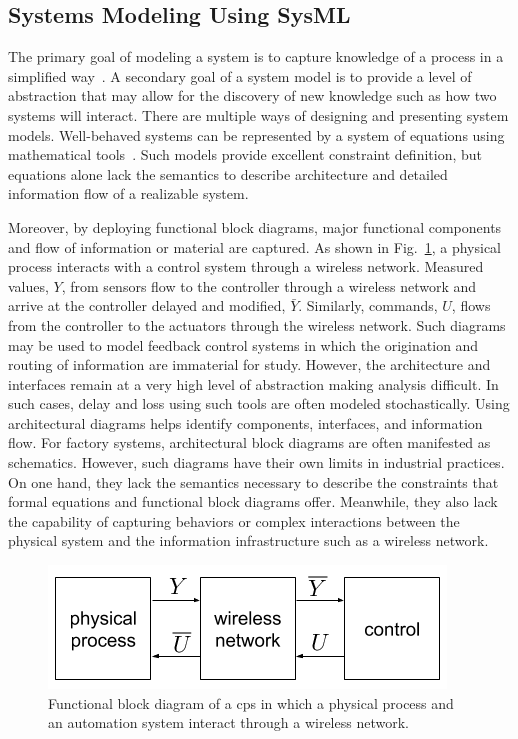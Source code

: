 \subsection{Systems Modeling Using SysML} \label{sysml:sec:systemsmodeling}

The primary goal of modeling a system is to capture knowledge of a process in a simplified way~\cite{SysModel2004}. A secondary goal of a system model is to provide a level of abstraction that may allow for the discovery of new knowledge such as how two systems will interact. There are multiple ways of designing and presenting system models. Well-behaved systems can be represented by a system of equations using mathematical tools~\cite{SimModel1999}. Such models provide excellent constraint definition, but equations alone lack the semantics to describe architecture and detailed information flow of a realizable system.

Moreover, by deploying functional block diagrams, major functional components and flow of information or material are captured. As shown in Fig.~\ref{sysml:fig:fbd-system}, a physical process interacts with a control system through a wireless network.  Measured values, $Y$, from sensors flow to the controller through a wireless network and arrive at the controller delayed and modified, $\bar{Y}$. Similarly, commands, $U$, flows from the controller to the actuators through the wireless network. Such diagrams may be used to model feedback control systems in which the origination and routing of information are immaterial for study. However, the architecture and interfaces remain at a very high level of abstraction making analysis difficult. In such cases, delay and loss using such tools are often modeled stochastically. Using architectural diagrams helps identify components, interfaces, and information flow. For factory systems, architectural block diagrams are often manifested as schematics. However, such diagrams have their own limits in industrial practices. On one hand, they lack the semantics necessary to describe the constraints that formal equations and functional block diagrams offer. Meanwhile, they also lack the capability of capturing behaviors or complex interactions between the physical system and the information infrastructure such as a wireless network. 

\begin{figure}
	\centering
	\includegraphics[width=0.65\columnwidth]{./chapter-sysml/diagrams/fbd-system}
	\caption{Functional block diagram of a \gls{cps} in which a physical process and an automation system interact through a wireless network.}
	\label{sysml:fig:fbd-system}
\end{figure}

